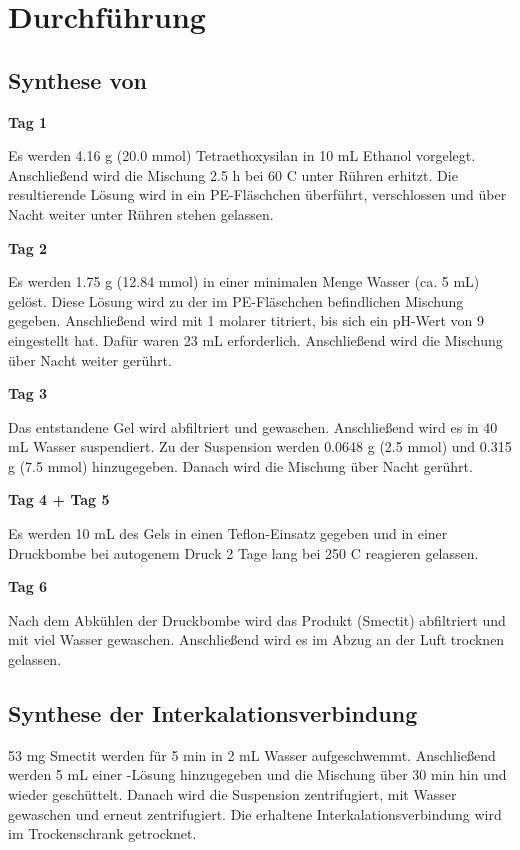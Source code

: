 \documentclass[12pt, a4paper]{article}
\begin{document}
\newpage
\newcommand{\tagsection}[1]{
  \vspace{1em}
  \noindent\textbf{\large #1}\\
  \vspace{0.0001cm}
}

\section{Durchführung}
\subsection{\texorpdfstring{Synthese von }{Synthese von Na0.5·nH2O(Zn2.5Li0.5)(Si4O10)F2}}

\tagsection{Tag 1}

\noindent
Es werden 4.16 g (20.0 mmol) Tetraethoxysilan in 10 mL Ethanol vorgelegt. Anschließend wird die Mischung 2.5 h bei 60 \textdegree{}C unter Rühren erhitzt.
Die resultierende Lösung wird in ein PE-Fläschchen überführt, verschlossen und über Nacht weiter unter Rühren stehen gelassen.

\tagsection{Tag 2}

\noindent
Es werden 1.75 g (12.84 mmol)  in einer minimalen Menge Wasser (ca. 5 mL) gelöst. Diese Lösung wird zu der im PE-Fläschchen befindlichen Mischung gegeben. Anschließend wird mit 1 molarer  titriert, bis sich ein pH-Wert von 9 eingestellt hat. Dafür waren 23 mL  erforderlich. 
Anschließend wird die Mischung über Nacht weiter gerührt.

\tagsection{Tag 3}

\noindent
Das entstandene Gel wird abfiltriert und gewaschen. Anschließend wird es in 40 mL Wasser suspendiert. Zu der Suspension werden 0.0648 g (2.5 mmol)  und 0.315 g (7.5 mmol)  hinzugegeben. Danach wird die Mischung über Nacht gerührt.

\tagsection{Tag 4 + Tag 5}

\noindent
Es werden 10 mL des Gels in einen Teflon-Einsatz gegeben und in einer Druckbombe bei autogenem Druck 2 Tage lang bei 250 \textdegree C reagieren gelassen.

\tagsection{Tag 6}

\noindent
Nach dem Abkühlen der Druckbombe wird das Produkt (Smectit) abfiltriert und mit viel Wasser gewaschen. Anschließend wird es im Abzug an der Luft trocknen gelassen.


\subsection{Synthese der Interkalationsverbindung}
53 mg Smectit werden für 5 min in 2 mL Wasser aufgeschwemmt. Anschließend werden 5 mL einer -Lösung hinzugegeben und die Mischung über 30 min hin und wieder geschüttelt. Danach wird die Suspension zentrifugiert, mit Wasser gewaschen und erneut zentrifugiert. Die erhaltene Interkalationsverbindung wird im Trockenschrank getrocknet.
\end{document}
